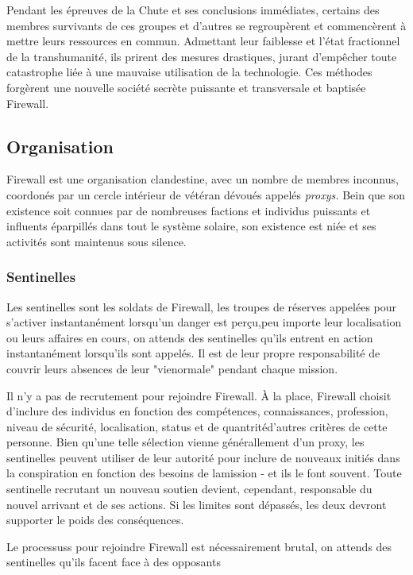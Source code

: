 Pendant les épreuves de la Chute et ses conclusions immédiates, certains des membres survivants de ces groupes et d'autres se regroupèrent et commencèrent à mettre leurs ressources en commun. Admettant leur faiblesse et l'état fractionnel de la transhumanité, ils prirent des mesures drastiques, jurant d'empêcher toute catastrophe liée à une mauvaise utilisation de la technologie. Ces méthodes forgèrent une nouvelle société secrète puissante et transversale et baptisée Firewall. 

\subsection{Organisation} 

Firewall est une organisation clandestine, avec un nombre de membres inconnus, coordonés par un cercle intérieur de vétéran dévoués appelés \textit{proxys.} Bein que son existence soit connues par de nombreuses factions et individus puissants et influents éparpillés dans tout le système solaire, son existence est niée et ses activités sont maintenus sous silence. 

\subsubsection{Sentinelles} 

Les sentinelles sont les soldats de Firewall, les troupes de réserves appelées pour s'activer instantanément lorsqu'un danger est perçu,peu importe leur localisation ou leurs affaires en cours, on attends des sentinelles qu'ils entrent en action instantanément lorsqu'ils sont appelés. Il est de leur propre responsabilité de couvrir leurs absences de leur "vienormale" pendant chaque mission. 

Il n'y a pas de recrutement pour rejoindre Firewall. À la place, Firewall choisit d'inclure des individus en fonction des compétences, connaissances, profession, niveau de sécurité, localisation, status et de quantritéd'autres critères de cette personne. Bien qu'une telle sélection vienne générallement d'un proxy, les sentinelles peuvent utiliser de leur autorité pour inclure de nouveaux initiés dans la conspiration en fonction des besoins de lamission - et ils le font souvent. Toute sentinelle recrutant un nouveau soutien devient, cependant, responsable du nouvel arrivant et de ses actions. Si les limites sont dépassés, les deux devront supporter le poids des conséquences. 

Le processuss pour rejoindre Firewall est nécessairement brutal, on attends des sentinelles qu'ils facent face à des opposants 


